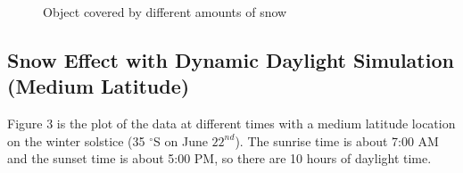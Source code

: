 \documentclass{article}
\begin{document}
\begin{figure}[h]
  \centering
  \caption{Object covered by different amounts of snow}
  \label{fig:PureSnow}
\end{figure}

\subsection {Snow Effect with Dynamic Daylight Simulation (Medium Latitude)}

Figure 3 is the plot of the data at different times with a medium latitude location on the winter solstice (35 $^{\circ}$S on June 
\(22^{nd}\)). The sunrise time is about 7:00 AM and the sunset time is about 5:00 PM, so there are 10 hours of daylight time.
\end{document}
